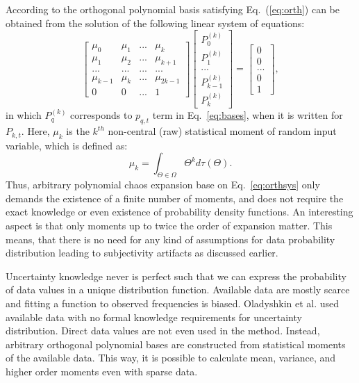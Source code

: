 According to \cite{oladyshkin2011concept} the orthogonal polynomial basis satisfying Eq.~(\ref{eq:orth}) can be obtained from the solution of the following linear system of equations: 
%
\begin{equation}
\left[\begin{array}{cccc}
\mu_{0} & \mu_{1} & ... & \mu_{k}\\
\mu_{1} & \mu_{2} & ... & \mu_{k+1}\\
... & ... & ... & ...\\
\mu_{k-1} & \mu_{k} & ... & \mu_{2k-1}\\
0 & 0 & ... & 1\end{array}\right]\left[\begin{array}{c}
P_{0}^{(k)}\\
P_{1}^{(k)}\\
...\\
P_{k-1}^{(k)}\\
P_{k}^{(k)}\end{array}\right]=\left[\begin{array}{c}
0\\
0\\
...\\
0\\
1\end{array}\right],\label{eq:orthsys}\end{equation} in which $P_{q}^{(k)}$ corresponds to $p_{q,t}$ term in Eq.~\ref{eq:bases}, when it is written for $P_{k,t}$.
Here, $\mu_{k}$ is the $k^{th}$ non-central (raw) statistical moment of random input variable, which is defined as:
%
\begin{equation} \mu_{k}=\int_{\Theta\in\Omega}\Theta^{k}d\tau(\Theta).\label{eq:mnt}\end{equation}
%
Thus, arbitrary polynomial chaos expansion base on Eq.~\ref{eq:orthsys} only demands the existence of a finite number of moments, and does not require the exact knowledge or even existence of probability density functions. An interesting aspect is that only moments up to twice the order of expansion matter. This means, that there is no need for any kind of assumptions for data probability distribution leading to subjectivity artifacts as discussed earlier.

Uncertainty knowledge never is perfect such that we can express the probability of data values in a unique distribution function. Available data are mostly scarce and fitting a function to observed frequencies is biased. Oladyshkin et al. \cite{oladyshkin2011concept} used available data with no formal knowledge requirements for uncertainty distribution. Direct data values are not even used in the method. Instead, arbitrary orthogonal polynomial bases are constructed from statistical moments of the available data. This way, it is possible to calculate mean, variance, and higher order moments even with sparse data. 


